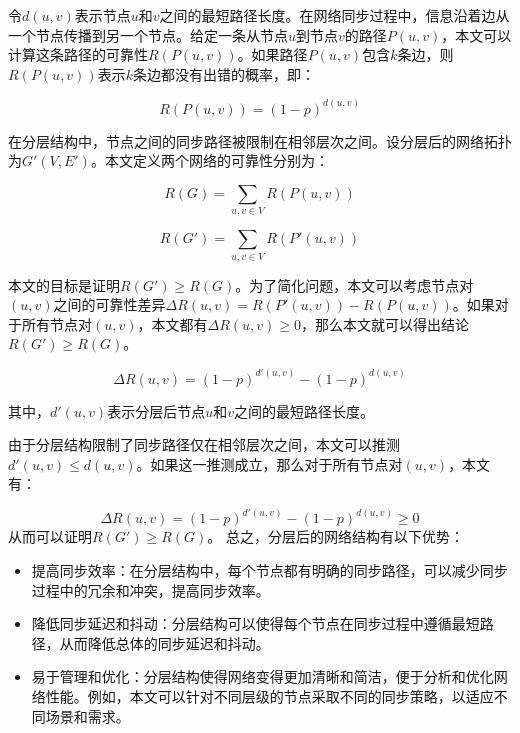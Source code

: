 \documentclass[UTF8,a4paper,12pt]{ctexart}
\numberwithin{equation}{section}
\begin{document}
令$d(u, v)$表示节点$u$和$v$之间的最短路径长度。在网络同步过程中，信息沿着边从一个节点传播到另一个节点。给定一条从节点$u$到节点$v$的路径$P(u, v)$，本文可以计算这条路径的可靠性$R(P(u, v))$。如果路径$P(u, v)$包含$k$条边，则$R(P(u, v))$表示$k$条边都没有出错的概率，即：

\begin{equation}
	R(P(u, v)) = (1 - p)^{d(u,v)}
\end{equation}

在分层结构中，节点之间的同步路径被限制在相邻层次之间。设分层后的网络拓扑为$G'(V, E')$。本文定义两个网络的可靠性分别为：

\begin{equation}
	R(G) = \sum_{u, v \in V} R(P(u, v))
\end{equation}

\begin{equation}
	R(G') = \sum_{u, v \in V} R(P'(u, v))
\end{equation}

本文的目标是证明$R(G') \ge R(G)$。为了简化问题，本文可以考虑节点对$(u, v)$之间的可靠性差异$\Delta R(u, v) = R(P'(u, v)) - R(P(u, v))$。如果对于所有节点对$(u, v)$，本文都有$\Delta R(u, v) \ge 0$，那么本文就可以得出结论$R(G') \ge R(G)$。

\begin{equation}
	\Delta R(u, v) = (1 - p)^{d'(u,v)} - (1 - p)^{d(u,v)}
\end{equation}

其中，$d'(u,v)$表示分层后节点$u$和$v$之间的最短路径长度。

由于分层结构限制了同步路径仅在相邻层次之间，本文可以推测$d'(u,v) \le d(u,v)$。如果这一推测成立，那么对于所有节点对$(u, v)$，本文有：

\begin{equation}
	\Delta R(u, v) = (1 - p)^{d'(u,v)} - (1 - p)^{d(u,v)} \ge 0
\end{equation}
从而可以证明$R(G') \ge R(G)$。
总之，分层后的网络结构有以下优势：
\begin{itemize}
	\item 提高同步效率：在分层结构中，每个节点都有明确的同步路径，可以减少同步过程中的冗余和冲突，提高同步效率。
	\item 降低同步延迟和抖动：分层结构可以使得每个节点在同步过程中遵循最短路径，从而降低总体的同步延迟和抖动。
	\item 易于管理和优化：分层结构使得网络变得更加清晰和简洁，便于分析和优化网络性能。例如，本文可以针对不同层级的节点采取不同的同步策略，以适应不同场景和需求。
\end{itemize}
\end{document}
